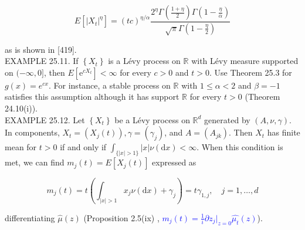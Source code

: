 \documentclass[a4paper,11pt]{article}
\begin{document}
\begin{equation*}
    E\left[\left|X_{t}\right|^{\eta}\right]=(t c)^{\eta / \alpha} \frac{2^{\eta} \Gamma\left(\frac{1+\eta}{2}\right) \Gamma\left(1-\frac{\eta}{\alpha}\right)}{\sqrt{\pi} \Gamma\left(1-\frac{\eta}{2}\right)} \tag{25.6}
\end{equation*}

as is shown in [419]. \\

EXAMPLE 25.11. If $\left\{X_{t}\right\}$ is a Lévy process on $\mathbb{R}$ with Lévy
measure supported on $(-\infty, 0]$, then $E\left[\mathrm{e}^{c X_{t}}\right]<\infty$
for every $c>0$ and $t>0$. Use Theorem 25.3 for $g(x)=e^{c x}$. For instance, a stable
process on $\mathbb{R}$ with $1 \leq \alpha<2$ and $\beta=-1$ satisfies this assumption
although it has support $\mathbb{R}$ for every $t>0$ (Theorem 24.10(i)). \\

EXAMPLE 25.12. Let $\left\{X_{t}\right\}$ be a Lévy process on $\mathbb{R}^{d}$ generated
by $(A, \nu, \gamma )$. In components, $X_{t}=\left(X_{j}(t)\right), \gamma=\left(\gamma_{j}\right)$,
and $A=\left(A_{j k}\right)$. Then $X_{t}$ has finite mean for $t>0$
if and only if $\int_{\{|x| >1\}} |x| \nu(\mathrm{d} x)<\infty$.
When this condition is met, we can find $m_{j}(t)=E\left[X_{j}(t)\right]$ expressed as


\begin{equation*}
    m_{j}(t)=t\left(\int_{|x|>1} x_{j} \nu(\mathrm{d} x)+\gamma_{j}\right)=t \gamma_{1, j}, \quad j=1, \ldots, d \tag{25.7}
\end{equation*}

differentiating $\widehat{\mu}(z)$ (Proposition 2.5(ix) , \textcolor{blue}{$m_{j}(t) = \frac{1}{i} \partial z_{j}|_{z=0} \widehat{\mu_{t}}(z)$}).
\end{document}
